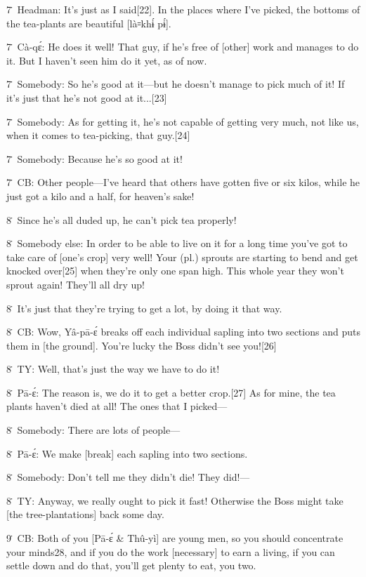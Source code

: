 7\. Headman: It's just as I said[22].  In the places where I've picked, the bottoms
of the tea-plants are beautiful [là꞊khɨ́ pɨ́].

7\. Cà-qɛ́: He does it well!  That guy, if he's free of [other] work and manages
to do it.  But I haven't seen him do it yet, as of now.

7\. Somebody: So he's good at it---but he doesn't manage to pick much of it!  If
it's just that he's not good at it...[23]

7\. Somebody: As for getting it, he's not capable of getting very much, not like
us, when it comes to tea-picking, that guy.[24]

7\. Somebody: Because he's so good at it!

7\. CB: Other people---I've heard that others have gotten five or six kilos, while
he just got a kilo and a half, for heaven's sake!

8\. Since he's all duded up, he can't pick tea properly!

8\. Somebody else: In order to be able to live on it for a long time you've got
to take care of [one's crop] very well!  Your (pl.) sprouts are starting to bend
and get knocked over[25] when they're only one span high.  This whole year they
won't sprout again!  They'll all dry up!

8\. It's just that they're trying to get a lot, by doing it that way.

8\. CB: Wow, Yâ-pā-ɛ́\textit{ }breaks off each individual sapling into two
sections and puts them in [the ground].  You're lucky the Boss didn't see you![26]

8\. TY: Well, that's just the way we have to do it!

8\. Pā-ɛ́: The reason is, we do it to get a better crop.[27]  As for mine,
the tea plants haven't died at all!  The ones that I picked---

8\. Somebody: There are lots of people---

8\. Pā-ɛ́: We make [break] each sapling into two sections.

8\. Somebody: Don't tell me they didn't die!  They did!---

8\. TY: Anyway, we really ought to pick it fast!  Otherwise the Boss might take
[the tree-plantations] back some day.

9\. CB: Both of you [Pā-ɛ́ \& Thû-yì] are young men, so you should concentrate
your minds28, and if you do the work [necessary] to earn a living, if you can settle
down and do that, you'll get plenty to eat, you two.

